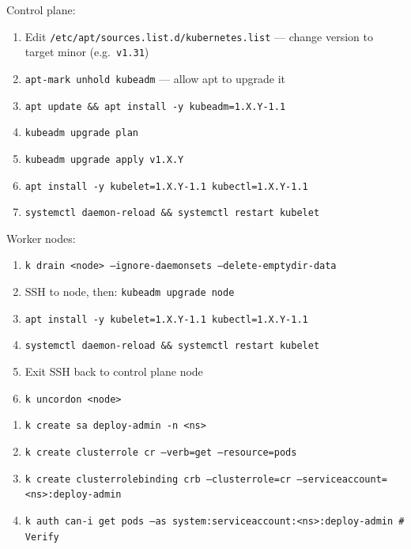 \begin{tcbitemize}[
  raster columns=3, raster equal height=rows,
  blanker, cheat subtitle
]
  \tcbitem
    \begin{tcbitemize}[
      raster columns=1, raster equal height=rows,
      blanker, cheat subtitle
    ]
      \tcbitem
          {\fontsize{6.5}{7.5}\selectfont\sffamily
          Control plane:
          \begin{enumerate}[leftmargin=1.2em, itemsep=0pt, parsep=0pt, topsep=1pt]
            \item Edit \texttt{/etc/apt/sources.list.d/kubernetes.list} — change version to target minor (e.g.\ \texttt{v1.31})
            \item \texttt{apt-mark unhold kubeadm} — allow apt to upgrade it
            \item \texttt{apt update \&\& apt install -y kubeadm=1.X.Y-1.1}
            \item \texttt{kubeadm upgrade plan}
            \item \texttt{kubeadm upgrade apply v1.X.Y}
            \item \texttt{apt install -y kubelet=1.X.Y-1.1 kubectl=1.X.Y-1.1}
            \item \texttt{systemctl daemon-reload \&\& systemctl restart kubelet}
          \end{enumerate}
          Worker nodes:
          \begin{enumerate}[leftmargin=1.2em, itemsep=0pt, parsep=0pt, topsep=1pt]
            \item \texttt{k drain <node> --ignore-daemonsets --delete-emptydir-data}
            \item SSH to node, then: \texttt{kubeadm upgrade node}
            \item \texttt{apt install -y kubelet=1.X.Y-1.1 kubectl=1.X.Y-1.1}
            \item \texttt{systemctl daemon-reload \&\& systemctl restart kubelet}
            \item Exit SSH back to control plane node
            \item \texttt{k uncordon <node>}
          \end{enumerate}}

      \tcbitem
          {\fontsize{6.5}{7.5}\selectfont\sffamily
          \begin{enumerate}[leftmargin=1.2em, itemsep=0pt, parsep=0pt, topsep=1pt]
            \item \texttt{k create sa deploy-admin -n <ns>}
            \item \texttt{k create clusterrole cr --verb=get --resource=pods}
            \item \texttt{k create clusterrolebinding crb --clusterrole=cr --serviceaccount=<ns>:deploy-admin}
            \item \texttt{k auth can-i get pods --as system:serviceaccount:<ns>:deploy-admin  \# Verify}
          \end{enumerate}}


\end{tcbitemize}
\end{tcbitemize}

